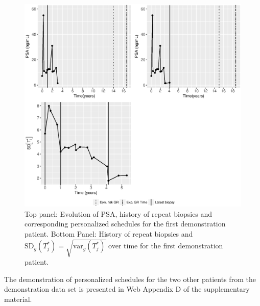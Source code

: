 \begin{figure}
\centerline{
\includegraphics[width=\columnwidth]{images/prias_demo/case_911.eps}
}
\caption{Top panel: Evolution of PSA, history of repeat biopsies and corresponding personalized schedules for the first demonstration patient. Bottom Panel: History of repeat biopsies and $\mbox{SD}_g(T^*_j) = \sqrt{\mbox{var}_g(T^*_j)}$ over time for the first demonstration patient.}
\label{fig : prias_demo_pid_911}
\end{figure}

The demonstration of personalized schedules for the two other patients from the demonstration data set is presented in Web Appendix D of the supplementary material.